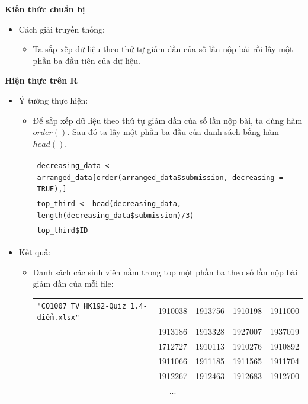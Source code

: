 \documentclass[a4paper]{article}
\theoremstyle{definition}
\begin{document}
\begin{enumerate}[a)]
    \bf Kiến thức chuẩn bị\normalfont
    \begin{itemize}
        \item Cách giải truyền thống:
        \begin{itemize}
            \item Ta sắp xếp dữ liệu theo thứ tự giảm dần của số lần nộp bài rồi lấy một phần ba đầu tiên của dữ liệu.
        \end{itemize}
    \end{itemize}
    \bf Hiện thực trên R\normalfont
    \begin{itemize}
        \item Ý tưởng thực hiện:
        \begin{itemize}
            \item Để sắp xếp dữ liệu theo thứ tự giảm dần của số lần nộp bài, ta dùng hàm $order()$. Sau đó ta lấy một phần ba đầu của danh sách bằng hàm $head()$.
            \begin{center}
                \begin{tabular}{p{13cm}}
                    \texttt{decreasing\_data <- arranged\_data[order(arranged\_data\$submission, decreasing = TRUE),]}\\
                    \texttt{top\_third <- head(decreasing\_data, length(decreasing\_data\$submission)/3)}\\
                    \texttt{top\_third\$ID}
                \end{tabular}
            \end{center}
        \end{itemize}
        \item Kết quả:
        \begin{itemize}
            \item Danh sách các sinh viên nằm trong top một phần ba theo số lần nộp bài giảm dần của mỗi file:
            \begin{center}
                \begin{tabular}{l c c c c}
                     \texttt{"CO1007\_TV\_HK192-Quiz 1.4-điểm.xlsx"} & 1910038 & 1913756 & 1910198 & 1911000 \\ & 1913186 & 1913328 & 1927007 & 1937019 \\ & 1712727 & 1910113 & 1910276 & 1910892 \\ & 1911066 & 1911185 & 1911565 & 1911704 \\ & 1912267 & 1912463 & 1912683 & 1912700\\
                     & ...\\

\end{tabular}
\end{center}
\end{itemize}
\end{itemize}
\end{enumerate}
\end{document}
